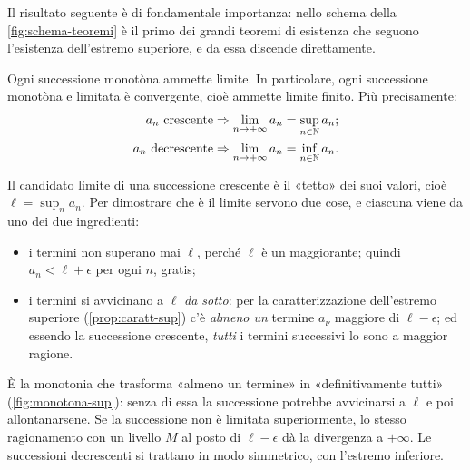 Il risultato seguente è di fondamentale importanza: nello schema della
\cref{fig:schema-teoremi} è il primo dei grandi teoremi di esistenza che seguono
l'esistenza dell'estremo superiore, e da essa discende direttamente.

\begin{teorema}\label{teo:monotone}
Ogni successione monotòna ammette limite. In particolare, ogni successione monotòna e
limitata è convergente, cioè ammette limite finito. Più precisamente:
\begin{equation}\label{eq:lim-monotone}
\begin{aligned}
  a_{n}\ \text{crescente} &\Rightarrow \lim_{n\to+\infty}a_{n}=\sup_{n\in\mathbb{N}}a_{n};\\
  a_{n}\ \text{decrescente} &\Rightarrow \lim_{n\to+\infty}a_{n}=\inf_{n\in\mathbb{N}}a_{n}.
\end{aligned}
\end{equation}
\end{teorema}

\begin{schema}
\end{schema}

\begin{strategia}
Il candidato limite di una successione crescente è il «tetto» dei suoi valori, cioè
$\ell=\sup_{n}a_{n}$. Per dimostrare che è il limite servono due cose, e ciascuna viene da
uno dei due ingredienti:
\begin{itemize}
  \item i termini non superano mai $\ell$, perché $\ell$ è un maggiorante; quindi
  $a_{n}<\ell+\epsilon$ per ogni $n$, gratis;
  \item i termini si avvicinano a $\ell$ \emph{da sotto}: per la caratterizzazione
  dell'estremo superiore (\cref{prop:caratt-sup}) c'è \emph{almeno un} termine $a_{\nu}$
  maggiore di $\ell-\epsilon$; ed essendo la successione crescente, \emph{tutti} i
  termini successivi lo sono a maggior ragione.
\end{itemize}
È la monotonia che trasforma «almeno un termine» in «definitivamente tutti»
(\cref{fig:monotona-sup}): senza di essa la successione potrebbe avvicinarsi a $\ell$ e poi allontanarsene. Se la successione
non è limitata superiormente, lo stesso ragionamento con un livello $M$ al posto di
$\ell-\epsilon$ dà la divergenza a $+\infty$. Le successioni decrescenti si trattano in
modo simmetrico, con l'estremo inferiore.
\end{strategia}


